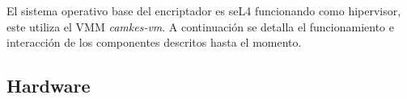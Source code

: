El sistema operativo base del encriptador es seL4 funcionando como hipervisor, este utiliza el VMM \textit{camkes-vm}. A continuación se detalla el funcionamiento e interacción de los componentes descritos hasta el momento.




\subsection{Hardware}

\clearpage